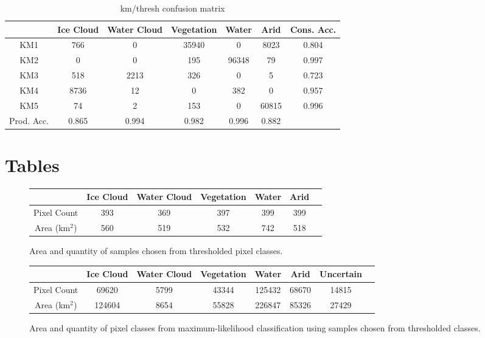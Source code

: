 \documentclass[12pt]{article}
\begin{document}
\begin{table}[h!]
\centering
\begin{tabular}{C|CCCCC|C}
& \textnormal{Ice Cloud} & \textnormal{Water Cloud} & \textnormal{Vegetation} & \textnormal{Water} & \textnormal{Arid} & \textnormal{Cons. Acc.} \\
\hline
\textnormal{KM1} & 766 & 0 & 35940 & 0 & 8023 & 0.804 \\
\textnormal{KM2} & 0 & 0 & 195 & 96348 & 79 & 0.997 \\
\textnormal{KM3} & 518 & 2213 & 326 & 0 & 5 & 0.723 \\
\textnormal{KM4} & 8736 & 12 & 0 & 382 & 0 & 0.957 \\
\textnormal{KM5} & 74 & 2 & 153 & 0 & 60815 & 0.996 \\

\hline
\textnormal{Prod. Acc.} & 0.865 & 0.994 & 0.982 & 0.996 & 0.882\\
\end{tabular}
\caption{km/thresh confusion matrix}
\label{confusion_km-thresh}
\end{table}


\clearpage
\section{Tables}


\begin{figure}[h!]
    \centering
    \begin{tabular}{c|cccccc}
    & Ice Cloud & Water Cloud & Vegetation & Water & Arid \\
    \hline
    Pixel Count & 393 & 369 & 397 & 399 & 399\\
    Area (km$^2$) & 560 & 519 & 532 & 742 & 518\\
    \end{tabular}
    \caption{Area and quantity of samples chosen from thresholded pixel classes.}
    \label{sample_thresh_areas}
\end{figure}

\begin{figure}[h!]
    \centering
    \begin{tabular}{c|ccccccc}
    & Ice Cloud & Water Cloud & Vegetation & Water & Arid & Uncertain\\
    \hline
    Pixel Count & 69620 & 5799 & 43344 & 125432 & 68670 & 14815\\
    Area (km$^2$) & 124604 & 8654 & 55828 & 226847 & 85326 & 27429\\
    \end{tabular}
    \caption{Area and quantity of pixel classes from maximum-likelihood classification using samples chosen from thresholded classes.}
    \label{mlc_thresh_areas}
\end{figure}
\end{document}

